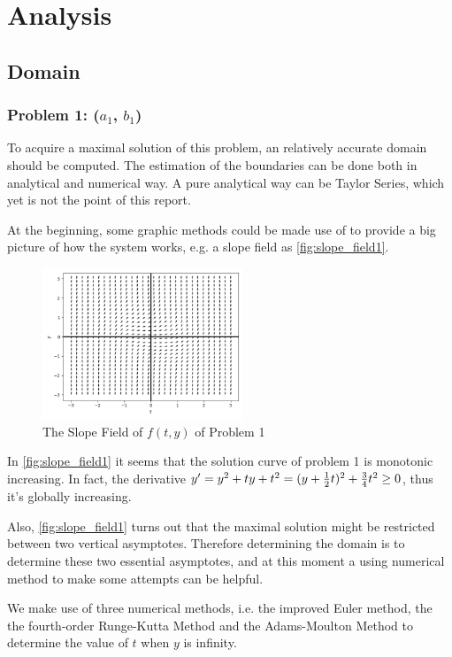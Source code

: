 \documentclass[a4paper]{article}
\begin{document}
    \section{Analysis}
    
    \subsection{Domain}
    
    \subsubsection{Problem 1: ($a_1$, $b_1$)}
    	
    	To acquire a maximal solution of this problem, an relatively accurate domain should be computed. The estimation of the boundaries can be done both in analytical and numerical way. A pure analytical way can be Taylor Series, which yet is not the point of this report.
	
	At the beginning, some graphic methods could be made use of to provide a big picture of how the system works, e.g. a slope field as \autoref{fig:slope_field1}.
	
	\begin{figure}[H]
		\centering
		\includegraphics[width=6cm]{img/slope_field1.png}
		\caption{\label{fig:slope_field1} The Slope Field of $f(t, y)$ of Problem 1}
	\end{figure}
	
	In \autoref{fig:slope_field1} it seems that the solution curve of problem 1 is monotonic increasing. In fact, the derivative $y' = y^2 + ty + t^2 = (y + {1 \over 2}t)^2 + {3 \over 4}t^2 \geq 0$, thus it's globally increasing.
	
    Also, \autoref{fig:slope_field1} turns out that the maximal solution might be restricted between two vertical asymptotes. Therefore determining the domain is to determine these two essential asymptotes, and at this moment a using numerical method to make some attempts can be helpful.
    
    We make use of three numerical methods, i.e. the improved Euler method, the the fourth-order Runge-Kutta Method and the Adams-Moulton Method to determine the value of $t$ when $y$ is infinity.
    
\end{document}
